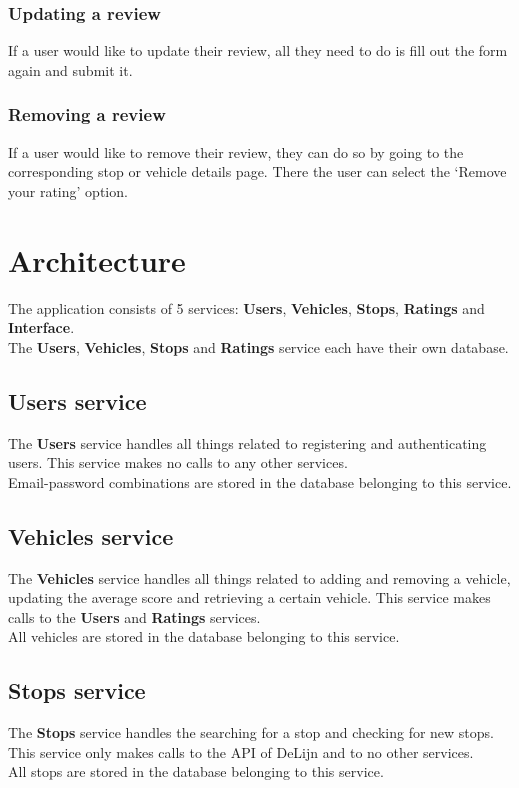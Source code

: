 \documentclass[12pt]{article}
\begin{document}
\subsubsection{Updating a review}
If a user would like to update their review, all they need to do is fill out the form again and submit it.

\subsubsection{Removing a review}
If a user would like to remove their review, they can do so by going to the corresponding stop or vehicle details page. There the user can select the `Remove your rating' option.
\newpage

\section{Architecture}
The application consists of 5 services: \textbf{Users}, \textbf{Vehicles}, \textbf{Stops}, \textbf{Ratings} and \textbf{Interface}.\\
The \textbf{Users}, \textbf{Vehicles}, \textbf{Stops} and \textbf{Ratings} service each have their own database. 

\subsection{Users service}
The \textbf{Users} service handles all things related to registering and authenticating users. This service makes no calls to any other services.\\ 
Email-password combinations are stored in the database belonging to this service.

\subsection{Vehicles service}
The \textbf{Vehicles} service handles all things related to adding and removing a vehicle, updating the average score and retrieving a certain vehicle. This service makes calls to the \textbf{Users} and \textbf{Ratings} services.\\
All vehicles are stored in the database belonging to this service.

\subsection{Stops service}
The \textbf{Stops} service handles the searching for a stop and checking for new stops. This service only makes calls to the API of DeLijn and to no other services.\\ 
All stops are stored in the database belonging to this service.
\end{document}
